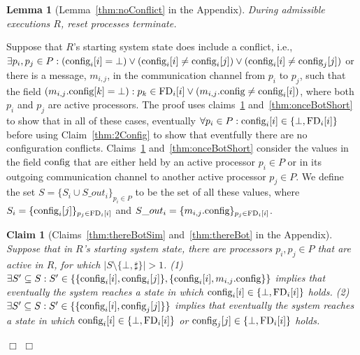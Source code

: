 \documentclass[11pt]{article}
\newtheorem{lemma}[theorem]{Lemma}
\newtheorem{claim}[theorem]{Claim}
\newenvironment{proofsketch}{\noindent{\bf Proof Sketch.}}{\hfill$\Box$}
\begin{document}
{\begin{proofsketch}
\begin{lemma}[Lemma~\ref{thm:noConflict} in the Appendix]
During admissible executions $R$, reset processes terminate. 
\end{lemma}
\begin{proofsketch}
Suppose that $R$'s starting system state does include a conflict, i.e., $\exists p_i, p_j \in P: (\textnormal{config}_i[i] = \bot)  \lor  (\textnormal{config}_i[i] \neq \textnormal{config}_i[j]) \lor (\textnormal{config}_i[i] \neq \textnormal{config}_j[j])$ or there is a message, $m_{i,j}$, in the communication channel from $p_i$ to $p_j$, such that the field $(m_{i,j}.\textnormal{config}[k] = \bot) : p_k \in \textnormal{FD}_i[i] \lor (m_{i,j}.\textnormal{config}\neq\textnormal{config}_i[i])$, where both $p_i$ and $p_j$ are active processors. 
The proof uses claims~\ref{thm:thereBotSimShort} and~\ref{thm:onceBotShort} to show that in all of these cases, eventually $\forall p_i \in P: \textnormal{config}_i[i] \in \{ \bot, \textnormal{FD}_i[i] \}$ before using Claim~\ref{thm:2Config} to show that eventfully there are no configuration conflicts.
Claims~\ref{thm:thereBotSimShort} and~\ref{thm:onceBotShort} consider the values in the field $\textnormal{config}$ that are either held by an active processor $p_i \in P$ or in its outgoing communication channel to another active processor $p_j \in P$. We define the set $S= \{ S_i \cup S\_out_{i} \}_{p_i \in P}$ to be the set of all these values, where $S_i = \{ \textnormal{config}_i[j] \}_{p_j \in \textnormal{FD}_i[i]}$ and $S\_out_{i} = \{ m_{i,j}.\textnormal{config} \}_{p_j \in \textnormal{FD}_i[i]}$. 





\begin{claim}[Claims~\ref{thm:thereBotSim} and~\ref{thm:thereBot} in the Appendix]
\label{thm:thereBotSimShort}
Suppose that in $R$'s starting system state, there are processors $p_i, p_j \in P$ that are active in $R$, for which $|S  \setminus \{ \bot, \sharp \} |>1$. (1) $\exists S' \subseteq S : S' \in \{ \{ \textnormal{config}_i[i], \textnormal{config}_i[j] \}, \{ \textnormal{config}_i[i], m_{i,j}.\textnormal{config} \} \}$ implies that eventually the system reaches a state in which $\textnormal{config}_i[i] \in \{ \bot, \textnormal{FD}_i[i] \}$ holds. (2) $\exists S' \subseteq S : S' \in \{ \{ \textnormal{config}_i[i], \textnormal{config}_j[j] \} \}$ implies that eventually the system reaches a state in which $\textnormal{config}_i[i] \in \{ \bot, \textnormal{FD}_i[i] \}$ or $\textnormal{config}_j[j] \in \{ \bot, \textnormal{FD}_i[i] \}$ holds. 
\end{claim} 


\end{proofsketch}
\end{proofsketch}}
\end{document}
